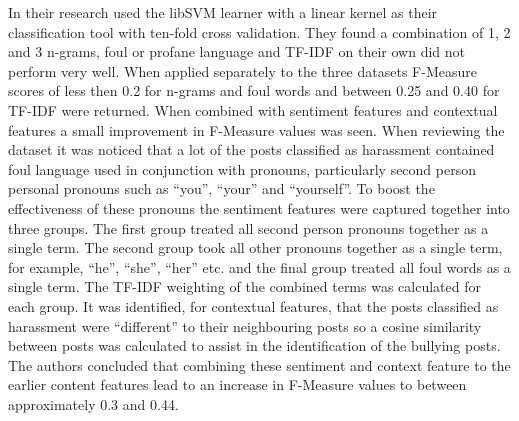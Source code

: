 In their research \citet{yin_detection_2009} used the libSVM \cite{CC01a} learner with a linear kernel as their classification tool with ten-fold cross validation. They found a combination of 1, 2 and 3 n-grams, foul or profane language and TF-IDF on their own did not perform very well. When applied separately to the three datasets F-Measure scores of less then 0.2 for n-grams and foul words and between 0.25 and 0.40 for TF-IDF were returned. When combined with sentiment features and contextual features a small improvement in F-Measure values was seen. When reviewing the dataset it was noticed that a lot of the posts classified as harassment contained foul language used in conjunction with pronouns, particularly second person personal pronouns such as ``you'', ``your'' and ``yourself''. To boost the effectiveness of these pronouns the sentiment features were captured together into three groups. The first group treated all second person pronouns together as a single term. The second group took all other pronouns together as a single term, for example, ``he'', ``she'', ``her'' etc. and the final group treated all foul words as a single term. The TF-IDF weighting of the combined terms was calculated for each group. It was identified, for contextual features, that the posts classified as harassment were ``different'' to their neighbouring posts so a cosine similarity between posts was calculated to assist in the identification of the bullying posts. The authors concluded that combining these sentiment and context feature to the earlier content features lead to an increase in F-Measure values to between approximately 0.3 and 0.44.

